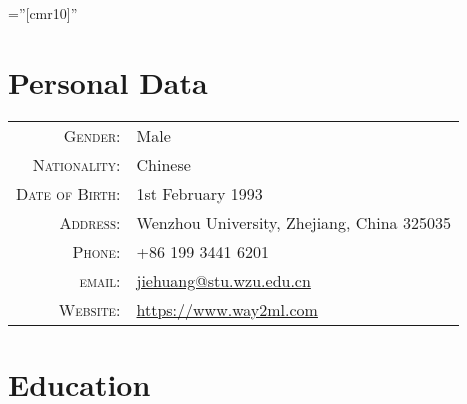 \documentclass[a4paper,10pt]{article} %
\begin{document}
\font\fb=''[cmr10]'' %

\par{\bigskip\par} %

\section{Personal Data}

\begin{tabular}{rl}
\textsc{Gender:}                  	& Male \\
\textsc{Nationality:}               & Chinese \\
\textsc{Date of Birth:} 	        & 1st February 1993  \\
\textsc{Address:} 					& Wenzhou University, Zhejiang, China 325035  \\
\textsc{Phone:} 					& +86 199 3441 6201\\
\textsc{email:} 					& \href{mailto:jiehuang@stu.wzu.edu.cn}{jiehuang@stu.wzu.edu.cn} \\
\textsc{Website:}                   & \href{https://www.way2ml.com}{https://www.way2ml.com}\\
\end{tabular}



\section{Education}
\end{document}
